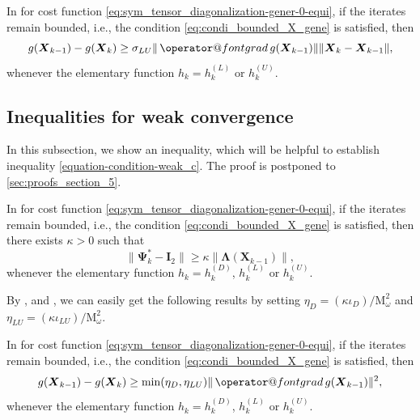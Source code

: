 \documentclass[final,onefignum,onetabnum]{siamart190516}
\makeatletter
\newcommand{\matr}[1]{\boldsymbol{#1}}
\newcommand{\ProjGrad}[2]{\mathop{{\operator@font grad} }#1(#2)}
\newcommand{\Utwo}{\Psi}
\makeatother
\begin{document}
\begin{corollary}\label{lemma:global_rho_c-2}
In  for cost function \cref{eq:sym_tensor_diagonalization-gener-0-equi},
if the iterates remain bounded, i.e., the condition \cref{eq:condi_bounded_X_gene} is satisfied, then 
\begin{equation*}
g(\matr{X}_{k-1})-g(\matr{X}_{k})\geq\sigma_{LU}\|\ProjGrad{g}{\matr{X}_{k-1}}\|\|\matr{X}_{k}-\matr{X}_{k-1}\|,
\end{equation*}
whenever the elementary function $h_k=h^{(L)}_{k}$ or $h^{(U)}_k$.  	
\end{corollary}

\subsection{Inequalities for weak convergence}
In this subsection, we show an inequality, which will be helpful to establish inequality \cref{equation-condition-weak_c}. 
The proof is postponed to
\cref{sec:proofs_section_5}. 

\begin{lemma}\label{lemma:weak_rho_inequality_c-1}
In  for cost function \cref{eq:sym_tensor_diagonalization-gener-0-equi},
if the iterates remain bounded, i.e., the condition \cref{eq:condi_bounded_X_gene} is satisfied, then there exists $\kappa>0$ such that 
\begin{equation*}
\|\matr{\Utwo}^{*}_{k}-\matr{I}_{2}\|\geq	\kappa\|\matr{\Lambda}(\matr{X}_{k-1})\|,
\end{equation*}
whenever the elementary function $h_k=h^{(D)}_{k}$, $h^{(L)}_{k}$ or $h^{(U)}_k$. 
\end{lemma}

By ,  and , we can easily get the following results by setting $\eta_{D}=(\kappa\iota_{D})/\mathrm{M}_{\omega}^2$ and 
$\eta_{LU}=(\kappa\iota_{LU})/\mathrm{M}_{\omega}^2$.

\begin{corollary}\label{lemma:weak_rho_inequality_c}
In  for cost function \cref{eq:sym_tensor_diagonalization-gener-0-equi},
if the iterates remain bounded, i.e., the condition \cref{eq:condi_bounded_X_gene} is satisfied, then 
\begin{equation}\label{equation-condition-weak_c-4}
g(\matr{X}_{k-1})-g(\matr{X}_{k})\geq\min(\eta_{D},\eta_{LU})\|\ProjGrad{g}{\matr{X}_{k-1}}\|^2,
\end{equation}
whenever the elementary function $h_k=h^{(D)}_{k}$, $h^{(L)}_{k}$ or $h^{(U)}_k$. 
\end{corollary}
\end{document}
